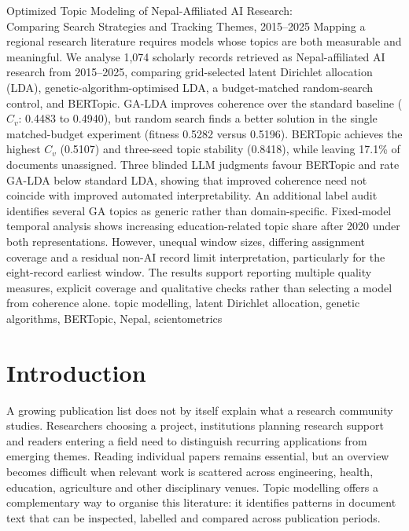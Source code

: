 \paperhead
{Optimized Topic Modeling of Nepal-Affiliated AI Research:\\
Comparing Search Strategies and Tracking Themes, 2015--2025}
{%
Mapping a regional research literature requires models whose topics are both measurable and
meaningful. We analyse 1,074 scholarly records retrieved as Nepal-affiliated AI research from
2015--2025, comparing grid-selected latent Dirichlet allocation (LDA), genetic-algorithm-optimised
LDA, a budget-matched random-search control, and BERTopic. GA-LDA improves coherence over the
standard baseline ($C_v$: 0.4483 to 0.4940), but random search finds a better solution in the
single matched-budget experiment (fitness 0.5282 versus 0.5196). BERTopic achieves the highest
$C_v$ (0.5107) and three-seed topic stability (0.8418), while leaving 17.1\% of documents
unassigned. Three blinded LLM judgments favour BERTopic and rate GA-LDA below standard LDA,
showing that improved coherence need not coincide with improved automated interpretability.
An additional label audit identifies several GA topics as generic rather than domain-specific.
Fixed-model temporal analysis shows increasing education-related topic share after 2020 under
both representations. However, unequal window sizes, differing assignment coverage and a
residual non-AI record limit interpretation, particularly for the eight-record earliest window.
The results support reporting multiple quality measures, explicit coverage and qualitative
checks rather than selecting a model from coherence alone.%
}
{topic modelling, latent Dirichlet allocation, genetic algorithms, BERTopic, Nepal, scientometrics}

\section{Introduction}
\label{sec:t1-intro}

A growing publication list does not by itself explain what a research community studies.
Researchers choosing a project, institutions planning research support and readers entering a
field need to distinguish recurring applications from emerging themes. Reading individual
papers remains essential, but an overview becomes difficult when relevant work is scattered
across engineering, health, education, agriculture and other disciplinary venues. Topic
modelling offers a complementary way to organise this literature: it identifies patterns in
document text that can be inspected, labelled and compared across publication periods.

